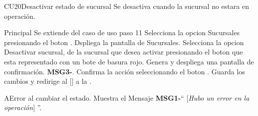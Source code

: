 \begin{UseCase}{CU20}{Desactivar estado de sucursal}{
		Se desactiva cuando la sucursal no estara en operación.
	}
	\end{UseCase}




	\begin{UCtrayectoria}{Principal}
		\UCpaso Se extiende del caso de uso  paso 11
		\UCpaso[\UCactor] Selecciona la opcion Sucursales presionando el boton .
		\UCpaso Dspliega la pantalla de Sucursales.
		\UCpaso[\UCactor] Selecciona la opcion Desactivar sucursal, de la sucursal que desea activar presionando el boton  que esta representado con un bote de basura rojo.		
		\UCpaso Genera y despliega una pantalla de confirmación.  {\bf MSG3-}.
		\UCpaso[\UCactor] Confirma la acción seleccionando el boton . 
		\UCpaso Guarda los cambios y redirige al [\UCactor] a la  .
	\end{UCtrayectoria}




\begin{UCtrayectoriaA}{A}{Error al cambiar el estado.}
			\UCpaso Muestra el Mensaje {\bf MSG1-}`` [{\em Hubo un error en la operación}] ''.
			
		\end{UCtrayectoriaA}


